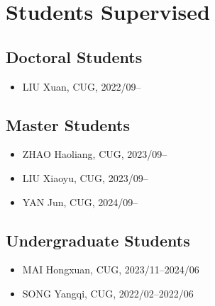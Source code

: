 \section{Students Supervised}

\subsection{Doctoral Students}
\begin{itemize}
\item LIU Xuan, CUG, 2022/09--
\end{itemize}

\subsection{Master Students}
\begin{itemize}
\item ZHAO Haoliang, CUG, 2023/09--
\item LIU Xiaoyu, CUG, 2023/09--
\item YAN Jun, CUG, 2024/09--
\end{itemize}

\subsection{Undergraduate Students}
\begin{itemize}
\item MAI Hongxuan, CUG, 2023/11--2024/06
\item SONG Yangqi, CUG, 2022/02--2022/06
\end{itemize}
